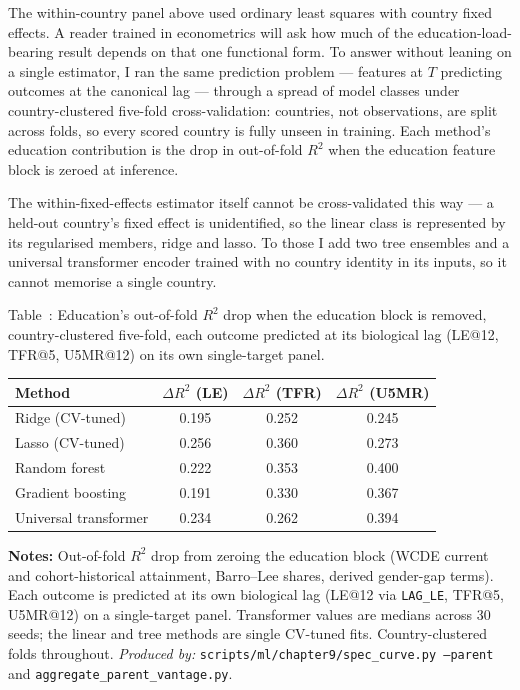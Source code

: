 \documentclass[12pt,letterpaper]{article}
\begin{document}
The within-country panel above used ordinary least squares with country
fixed effects. A reader trained in econometrics will ask how much of the
education-load-bearing result depends on that one functional form. To
answer without leaning on a single estimator, I ran the same prediction
problem --- features at $T$ predicting outcomes at the canonical lag ---
through a spread of model classes under country-clustered five-fold
cross-validation: countries, not observations, are split across folds,
so every scored country is fully unseen in training. Each method's
education contribution is the drop in out-of-fold $R^2$ when the
education feature block is zeroed at inference.

The within-fixed-effects estimator itself cannot be cross-validated this
way --- a held-out country's fixed effect is unidentified, so the linear
class is represented by its regularised members, ridge and lasso. To
those I add two tree ensembles and a universal transformer encoder
trained with no country identity in its inputs, so it cannot memorise a
single country.

\label{tab:spec-curve}Table~\thetable: Education's out-of-fold $R^2$ drop when the education block is removed, country-clustered five-fold, each outcome predicted at its biological lag (LE@12, TFR@5, U5MR@12) on its own single-target panel.

{\small\setlength{\tabcolsep}{6pt}
\begin{longtable}[]{@{}lccc@{}}
\toprule
Method & $\Delta R^2$ (LE) & $\Delta R^2$ (TFR) & $\Delta R^2$ (U5MR) \\
\midrule
\endhead
Ridge (CV-tuned)      & 0.195 & 0.252 & 0.245 \\
Lasso (CV-tuned)      & 0.256 & 0.360 & 0.273 \\
Random forest         & 0.222 & 0.353 & 0.400 \\
Gradient boosting     & 0.191 & 0.330 & 0.367 \\
Universal transformer & 0.234 & 0.262 & 0.394 \\
\bottomrule
\end{longtable}}\addtocounter{table}{-1}

\begin{minipage}{\dimexpr\textwidth-2em}
\scriptsize
\textbf{Notes:} Out-of-fold $R^2$ drop from zeroing the education block
(WCDE current and cohort-historical attainment, Barro--Lee shares,
derived gender-gap terms). Each outcome is predicted at its own
biological lag (LE@12 via \texttt{LAG\_LE}, TFR@5, U5MR@12) on a
single-target panel. Transformer values are medians across 30 seeds;
the linear and tree methods are single CV-tuned fits.
Country-clustered folds throughout. \textit{Produced by:}
\texttt{scripts/ml/chapter9/spec\_curve.py~--parent} and
\texttt{aggregate\_parent\_vantage.py}.
\end{minipage}
\end{document}
